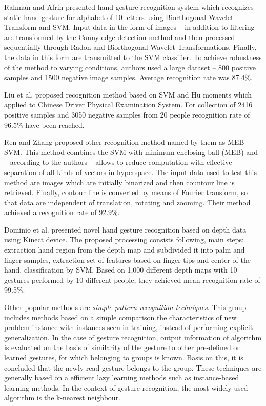 Rahman and Afrin \cite{RahmanHand} presented hand gesture recognition system which recognizes static hand gesture for alphabet of 10 letters using Biorthogonal Wavelet Transform and SVM. Input data in the form of images -- in addition to filtering -- are transformed by the Canny edge detection method and then processed sequentially through Radon and Biorthogonal Wavelet Transformations. Finally, the data in this form are transmitted to the SVM classifier. To achieve robustness of the method to varying conditions, authors used a large dataset -- 800 positive samples and 1500 negative image samples. Average recognition rate was 87.4\%.

Liu et al. \cite{LiuStatic} proposed recognition method based on SVM and Hu moments which applied to Chinese Driver Physical Examination System. For collection of 2416 positive samples and 3050 negative samples from 20 people recognition rate of 96.5\% have been reached.

Ren and Zhang \cite{RenMEBSVM} proposed other recognition method named by them as MEB-SVM. This method combines the SVM with minimum enclosing ball (MEB) and -- according to the authors -- allows to reduce computation with effective separation of all kinds of vectors in hyperspace. The input data used to test this method are images which are initially binarized and then countour line is retrieved. Finally, contour line is converted by means of Fourier transform, so that data are independent of translation, rotating and zooming. Their method achieved a recognition rate of 92.9\%.


Dominio et al. \cite{Dominio:2013:HGR:2510650.2510651} presented novel hand gesture recognition based on depth data using Kinect device. The proposed processing consists following, main steps: extraction hand region from the depth map and subdivided it into palm and finger samples, extraction set of features based on finger tips and center of the hand, classification by SVM. Based on 1,000 different depth maps with 10 gestures performed by 10 different people, they achieved mean recognition rate of 99.5\%.

Other popular methods are \emph{simple pattern recognition techniques}. This group includes methods based on a simple comparison the characteristics of new problem instance with instances seen in training, instead of performing explicit generalization. In the case of gesture recognition, output information of algorithm is evaluated on the basis of similarity of the gesture to other pre-defined or learned gestures, for which belonging to groups is known. Basis on this, it is concluded that the newly read gesture belongs to the group. These techniques are generally based on a efficient lazy learning methods such as instance-based learning methods.  In the context of gesture recognition, the most widely used algorithm is the k-nearest neighbour.

